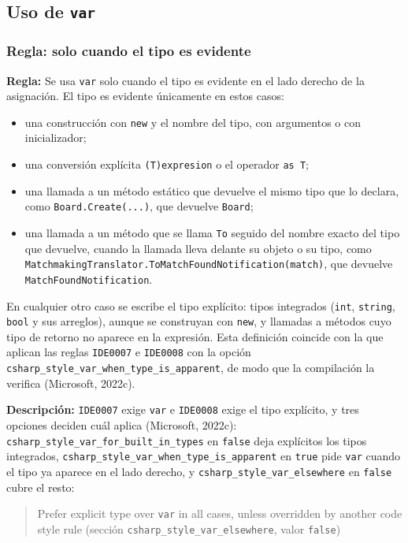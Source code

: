 \subsection{Uso de \texttt{var}}

\subsubsection{Regla: solo cuando el tipo es evidente}

\textbf{Regla:} Se usa \texttt{var} solo cuando el tipo es evidente en el lado derecho de la asignación. El tipo es evidente únicamente en estos casos:

\begin{itemize}
  \item una construcción con \texttt{new} y el nombre del tipo, con argumentos o con inicializador;
  \item una conversión explícita \texttt{(T)expresion} o el operador \texttt{as T};
  \item una llamada a un método estático que devuelve el mismo tipo que lo declara, como \texttt{Board.Create(...)}, que devuelve \texttt{Board};
  \item una llamada a un método que se llama \texttt{To} seguido del nombre exacto del tipo que devuelve, cuando la llamada lleva delante su objeto o su tipo, como \texttt{MatchmakingTranslator.\allowbreak ToMatchFoundNotification(match)}, que devuelve \texttt{MatchFoundNotification}.
\end{itemize}

En cualquier otro caso se escribe el tipo explícito: tipos integrados (\texttt{int}, \texttt{string}, \texttt{bool} y sus arreglos), aunque se construyan con \texttt{new}, y llamadas a métodos cuyo tipo de retorno no aparece en la expresión. Esta definición coincide con la que aplican las reglas \texttt{IDE0007} e \texttt{IDE0008} con la opción \texttt{csharp\_style\_var\_when\_type\_is\_apparent}, de modo que la compilación la verifica (Microsoft, 2022c).

\textbf{Descripción:} \texttt{IDE0007} exige \texttt{var} e \texttt{IDE0008} exige el tipo explícito, y tres opciones deciden cuál aplica (Microsoft, 2022c): \texttt{csharp\_style\_var\_for\_built\_in\_types} en \texttt{false} deja explícitos los tipos integrados, \texttt{csharp\_style\_var\_when\_type\_is\_apparent} en \texttt{true} pide \texttt{var} cuando el tipo ya aparece en el lado derecho, y \texttt{csharp\_style\_var\_elsewhere} en \texttt{false} cubre el resto:
\begin{quote}
Prefer explicit type over \texttt{var} in all cases, unless overridden by another code style rule (sección \texttt{csharp\_style\_var\_elsewhere}, valor \texttt{false})
\end{quote}

